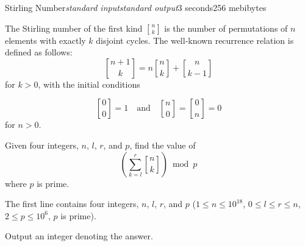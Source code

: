 \begin{problem}{Stirling Number}{\textsl{standard input}}{\textsl{standard output}}{3 seconds}{256 mebibytes}

\newcommand{\stirling}[2]{\genfrac{[}{]}{0pt}{}{#1}{#2}}

The Stirling number of the first kind $\stirling{n}{k}$ is the number of permutations of $n$ elements with exactly $k$ disjoint cycles. The well-known recurrence relation is defined as follows:
$$\stirling{n + 1}{k} = n \stirling{n}{k} + \stirling{n}{k - 1}$$
for $k>0$, with the initial conditions

$$\stirling{0}{0} = 1 \quad {\mbox{and}} \quad \stirling{n}{0} = \stirling{0}{n} = 0$$
for $n > 0$.

Given four integers, $n$, $l$, $r$, and $p$, find the value of $$\left(\sum_{k=l}^{r}\stirling{n}{k} \right) \bmod p$$ where $p$ is prime.

\InputFile
The first line contains four integers, $n$, $l$, $r$, and $p$ ($1 \le n \le 10^{18}$, $0 \le l \le r \le n$, $2 \le p \le 10^6$, $p$ is prime).


\OutputFile
Output an integer denoting the answer.




\Examples

\begin{example}
%
%
%
\end{example}

\end{problem}
